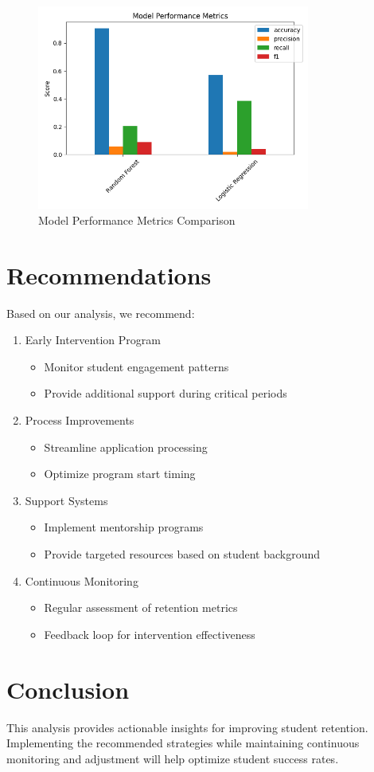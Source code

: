 \documentclass[12pt,a4paper]{article}
\begin{document}
\begin{figure}[ht]
    \centering
    \includegraphics[width=0.8\textwidth]{../Code/images/model_metrics.png}
    \caption{Model Performance Metrics Comparison}
    \label{fig:model_metrics}
\end{figure}

\section{Recommendations}
Based on our analysis, we recommend:
\begin{enumerate}
    \item Early Intervention Program
    \begin{itemize}
        \item Monitor student engagement patterns
        \item Provide additional support during critical periods
    \end{itemize}
    
    \item Process Improvements
    \begin{itemize}
        \item Streamline application processing
        \item Optimize program start timing
    \end{itemize}
    
    \item Support Systems
    \begin{itemize}
        \item Implement mentorship programs
        \item Provide targeted resources based on student background
    \end{itemize}
    
    \item Continuous Monitoring
    \begin{itemize}
        \item Regular assessment of retention metrics
        \item Feedback loop for intervention effectiveness
    \end{itemize}
\end{enumerate}

\section{Conclusion}
This analysis provides actionable insights for improving student retention. Implementing the recommended strategies while maintaining continuous monitoring and adjustment will help optimize student success rates.
\end{document}
